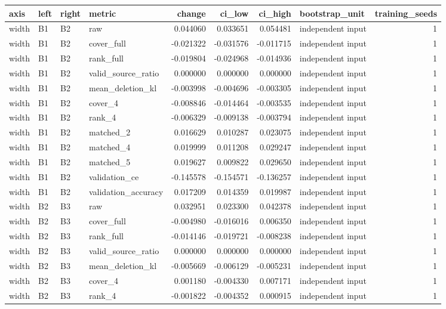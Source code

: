 \begin{tabular}{llllrrrlr}
\toprule
axis & left & right & metric & change & ci_low & ci_high & bootstrap_unit & training_seeds \\
\midrule
width & B1 & B2 & raw & 0.044060 & 0.033651 & 0.054481 & independent input & 1 \\
width & B1 & B2 & cover_full & -0.021322 & -0.031576 & -0.011715 & independent input & 1 \\
width & B1 & B2 & rank_full & -0.019804 & -0.024968 & -0.014936 & independent input & 1 \\
width & B1 & B2 & valid_source_ratio & 0.000000 & 0.000000 & 0.000000 & independent input & 1 \\
width & B1 & B2 & mean_deletion_kl & -0.003998 & -0.004696 & -0.003305 & independent input & 1 \\
width & B1 & B2 & cover_4 & -0.008846 & -0.014464 & -0.003535 & independent input & 1 \\
width & B1 & B2 & rank_4 & -0.006329 & -0.009138 & -0.003794 & independent input & 1 \\
width & B1 & B2 & matched_2 & 0.016629 & 0.010287 & 0.023075 & independent input & 1 \\
width & B1 & B2 & matched_4 & 0.019999 & 0.011208 & 0.029247 & independent input & 1 \\
width & B1 & B2 & matched_5 & 0.019627 & 0.009822 & 0.029650 & independent input & 1 \\
width & B1 & B2 & validation_ce & -0.145578 & -0.154571 & -0.136257 & independent input & 1 \\
width & B1 & B2 & validation_accuracy & 0.017209 & 0.014359 & 0.019987 & independent input & 1 \\
width & B2 & B3 & raw & 0.032951 & 0.023300 & 0.042378 & independent input & 1 \\
width & B2 & B3 & cover_full & -0.004980 & -0.016016 & 0.006350 & independent input & 1 \\
width & B2 & B3 & rank_full & -0.014146 & -0.019721 & -0.008238 & independent input & 1 \\
width & B2 & B3 & valid_source_ratio & 0.000000 & 0.000000 & 0.000000 & independent input & 1 \\
width & B2 & B3 & mean_deletion_kl & -0.005669 & -0.006129 & -0.005231 & independent input & 1 \\
width & B2 & B3 & cover_4 & 0.001180 & -0.004330 & 0.007171 & independent input & 1 \\
width & B2 & B3 & rank_4 & -0.001822 & -0.004352 & 0.000915 & independent input & 1 \\

\end{tabular}
